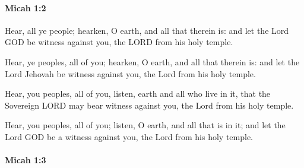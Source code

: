 		\paragraph{Micah 1:2} %
			\label{MICAH-1-2}

			Hear, all ye people; hearken, O earth, and all that therein is: and let the Lord GOD be witness against you, the LORD from his holy temple.

			\begin{versebox}
					\item[BHS] 
					\item[LXX] 
					\item[ASV] Hear, ye peoples, all of you; hearken, O earth, and all that therein is: and let the Lord Jehovah be witness against you, the Lord from his holy temple.
					\item[NIV] Hear, you peoples, all of you, listen, earth and all who live in it, that the Sovereign LORD may bear witness against you, the Lord from his holy temple.
					\item[NRSV] Hear, you peoples, all of you; listen, O earth, and all that is in it; and let the Lord GOD be a witness against you, the Lord from his holy temple.
			\end{versebox}

		\paragraph{Micah 1:3} %
			\label{MICAH-1-3}

